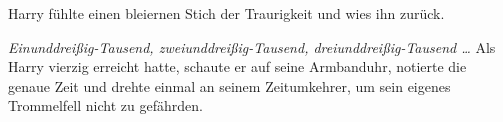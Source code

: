 Harry fühlte einen bleiernen Stich der Traurigkeit und wies ihn zurück.

\emph{Einunddreißig-Tausend, zweiunddreißig-Tausend, dreiunddreißig-Tausend …}
Als Harry vierzig erreicht hatte, schaute er auf seine Armbanduhr, notierte die genaue Zeit und drehte einmal an seinem Zeitumkehrer, um sein eigenes Trommelfell nicht zu gefährden.

